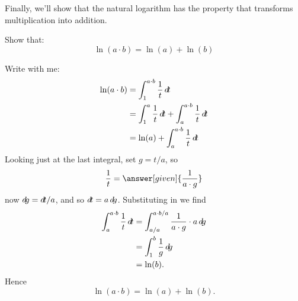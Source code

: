 \documentclass{ximera}
\begin{document}
Finally, we'll show that the natural logarithm has the property that
transforms multiplication into addition.

\begin{example}
  Show that:
  \[
  \ln(a\cdot b) = \ln(a) + \ln(b)
  \]
  \begin{explanation}
    Write with me:
    \begin{align*}
      \ln(a\cdot b) &= \int_1^{a\cdot b} \frac{1}{t}\d t\\
      &= \int_1^{a} \frac{1}{t}\d t + \int_a^{a\cdot b} \frac{1}{t}\d t\\
      &= \ln(a) + \int_a^{a\cdot b} \frac{1}{t}\d t
    \end{align*}
    Looking just at the last integral, set $g= t/a$, so
    \[
    \frac{1}{t} = \answer[given]{\frac{1}{a\cdot g}}
    \]
    now $\mathop{}\!d\! g = \mathop{}\!d\! t/a$, and so $\mathop{}\!d\! t= a \mathop{}\!d\! g$. Substituting in we find
    \begin{align*}
      \int_a^{a\cdot b} \frac{1}{t}\mathop{}\!d\! t &= \int_{a/a}^{a\cdot b/a} \frac{1}{a \cdot g} \cdot a \mathop{}\!d\! g\\
      &= \int_{1}^{b} \frac{1}{g}\mathop{}\!d\! g\\
      &= \ln(b).
    \end{align*}
    Hence
    \[
    \ln(a\cdot b) = \ln(a) + \ln(b).
    \]
  \end{explanation}
\end{example}
\end{document}
